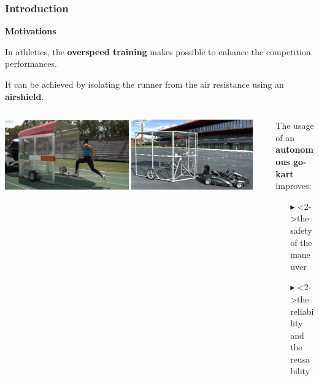 \documentclass[9pt, aspectratio=169]{beamer}
\begin{document}
\begin{frame}[t]
\frametitle{Introduction}
\vspace{0.1cm}
\textcolor{emph@Thesis}{\textbf{\small{Motivations}}} \\
\vspace{0.3cm}

In athletics, the \textbf{overspeed training} makes possible to enhance the competition performances.

It can be achieved by isolating the runner from the air resistance using an \textbf{airshield}.

\begin{columns}
\hspace{0.2cm}
\begin{column}{0.62\textwidth}
\vspace{0.2cm}
	\begin{center}
  		\includegraphics[width=0.48\textwidth]{Jacobs} 
		\onslide <2,3>\includegraphics[width=0.47\textwidth]{Windshield} 
	\end{center}
\end{column}
\begin{column}{0.38\textwidth}
The usage of an \textbf{autonomous go-kart} improves:
	\begin{itemize}
		\footnotesize
		\item[$\blacktriangleright$] <2->the safety of the maneuver
		\item[$\blacktriangleright$] <2->the reliability and the reusability 
	\end{itemize}
\end{column}
\end{columns}
\vspace{0.3cm}


\end{frame}
\end{document}
